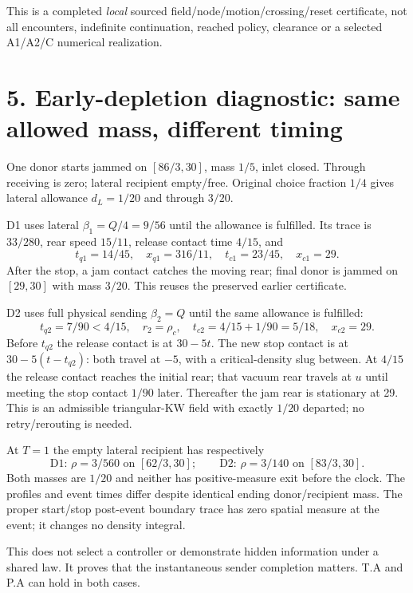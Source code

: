 \documentclass[11pt,a4paper]{article}
\begin{document}
This is a completed \emph{local} sourced field/node/motion/crossing/reset
certificate, not all encounters, indefinite continuation, reached policy,
clearance or a selected A1/A2/C numerical realization.

\newpage
\section*{5. Early-depletion diagnostic: same allowed mass, different timing}
One donor starts jammed on $[86/3,30]$, mass $1/5$, inlet closed. Through
receiving is zero; lateral recipient empty/free. Original choice fraction
$1/4$ gives lateral allowance $d_L=1/20$ and through $3/20$.

D1 uses lateral $\beta_1=Q/4=9/56$ until the allowance is fulfilled. Its
trace is $33/280$, rear speed $15/11$, release contact time $4/15$, and
\begin{equation}
 t_{q1}=14/45,\quad x_{q1}=316/11,\quad
 t_{c1}=23/45,\quad x_{c1}=29.
\end{equation}
After the stop, a jam contact catches the moving rear; final donor is jammed
on $[29,30]$ with mass $3/20$. This reuses the preserved earlier certificate.

D2 uses full physical sending $\beta_2=Q$ until the same allowance is fulfilled:
\begin{equation}
 t_{q2}=7/90<4/15,\quad r_2=\rho_c,
 \quad t_{c2}=4/15+1/90=5/18,\quad x_{c2}=29.
\end{equation}
Before $t_{q2}$ the release contact is at $30-5t$. The new stop contact is
at $30-5(t-t_{q2})$: both travel at $-5$, with a critical-density slug
between. At $4/15$ the release contact reaches the initial rear; that vacuum
rear travels at $u$ until meeting the stop contact $1/90$ later. Thereafter
the jam rear is stationary at 29. This is an admissible triangular-KW field
with exactly $1/20$ departed; no retry/rerouting is needed.

At $T=1$ the empty lateral recipient has respectively
\begin{equation}
 \text{D1: }\rho=3/560\text{ on }[62/3,30];\qquad
 \text{D2: }\rho=3/140\text{ on }[83/3,30].
\end{equation}
Both masses are $1/20$ and neither has positive-measure exit before the clock.
The profiles and event times differ despite identical ending donor/recipient
mass. The proper start/stop post-event boundary trace has zero spatial
measure at the event; it changes no density integral.

This does not select a controller or demonstrate hidden information under
a shared law. It proves that the instantaneous sender completion matters.
T.A and P.A can hold in both cases.
\end{document}
